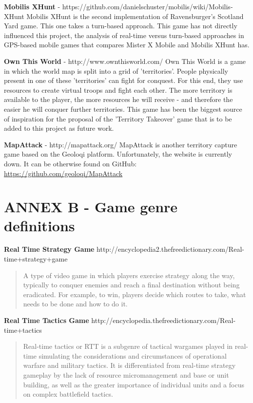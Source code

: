 \documentclass{article}
\begin{document}
\textbf{Mobilis XHunt} - https://github.com/danielschuster/mobilis/wiki/Mobilis-XHunt
\newline
Mobilis XHunt is the second implementation of Ravensburger's Scotland Yard game.
This one takes a turn-based approach. This game has not directly influenced this
project, the analysis\cite{rttvsrts2} of real-time versus turn-based approaches in
GPS-based mobile games that compares Mister X Mobile and Mobilis XHunt has.\newline

\textbf{Own This World} - http://www.ownthisworld.com/ \newline
Own This World is a game in which the world map is split into a grid of
'territories'. People physically present in one of these 'territories' can fight
for conquest. For this end, they use resources to create virtual troops and
fight each other. The more territory is available to the player, the more
resources he will receive - and therefore the easier he will conquer further
territories. This game has been the biggest source of inspiration for the
proposal of the 'Territory Takeover' game that is to be added to this project as
future work.\newline

\textbf{MapAttack} - http://mapattack.org/ \newline
MapAttack is another territory capture game based on the Geoloqi platform.
Unfortunately, the website is currently down. It can be otherwise found on GitHub:
\url{https://github.com/geoloqi/MapAttack}\newline


\section{ANNEX B - Game genre definitions}


\textbf{Real Time Strategy Game}		
http://encyclopedia2.thefreedictionary.com/Real-time+strategy+game
\begin{quote}
A type of video game in which players exercise strategy along the way, typically
to conquer enemies and reach a final destination without being eradicated. For
example, to win, players decide which routes to take, what needs to be done and
how to do it.
\end{quote}

\textbf{Real Time Tactics Game}
	http://encyclopedia.thefreedictionary.com/Real-time+tactics
\begin{quote}
Real-time tactics or RTT is a subgenre of tactical wargames played in real-time
simulating the considerations and circumstances of operational warfare and
military tactics. It is differentiated from real-time strategy gameplay by the
lack of resource micromanagement and base or unit building, as well as the
greater importance of individual units and a focus on complex battlefield
tactics.
\end{quote}
\end{document}
